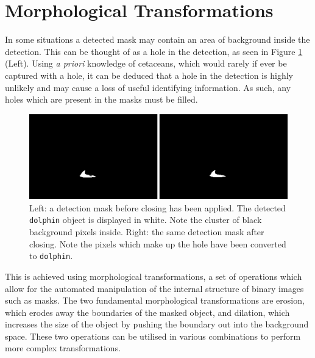 \section{Morphological Transformations}\label{ch:postProcessing,sec:morphologicalTransformations}

In some situations a detected mask may contain an area of background inside the detection. This can be thought of as a hole in the detection, as seen in Figure \ref{fig:before-and-after-morphing-masks-only} (Left). Using \textit{a priori} knowledge of cetaceans, which would rarely if ever be captured with a hole, it can be deduced that a hole in the detection is highly unlikely and may cause a loss of useful identifying information. As such, any holes which are present in the masks must be filled.  

\begin{figure}
	\begin{center}
		\includegraphics[scale=0.5]{Chapter5/figs/before-and-after-morphing-masks-only.png}
	\end{center}
	\caption[Left: a detection mask before closing has been applied. Right: the same detection mask after closing.]{Left: a detection mask before closing has been applied. The detected \texttt{dolphin} object is displayed in white. Note the cluster of black background pixels inside. Right: the same detection mask after closing. Note the pixels which make up the hole have been converted to \texttt{dolphin}.}
	\label{fig:before-and-after-morphing-masks-only}
\end{figure}

This is achieved using morphological transformations, a set of operations which allow for the automated manipulation of the internal structure of binary images such as masks. The two fundamental morphological transformations are erosion, which erodes away the boundaries of the masked object, and dilation, which increases the size of the object by pushing the boundary out into the background space. These two operations can be utilised in various combinations to perform more complex transformations.


